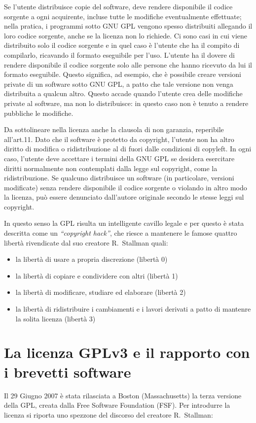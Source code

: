 Se l'utente distribuisce copie del software, deve rendere disponibile il codice sorgente a ogni acquirente, incluse tutte le modifiche eventualmente effettuate; nella pratica, i programmi sotto GNU GPL vengono spesso distribuiti allegando il loro codice sorgente, anche se la licenza non lo richiede. Ci sono casi in cui viene distribuito solo il codice sorgente e in quel caso è l'utente che ha il compito di compilarlo, ricavando il formato eseguibile per l'uso.
L'utente ha il dovere di rendere disponibile il codice sorgente solo alle persone che hanno ricevuto da lui il formato eseguibile. Questo significa, ad esempio, che è possibile creare versioni private di un software sotto GNU GPL, a patto che tale versione non venga distribuita a qualcun altro. Questo accade quando l'utente crea delle modifiche private al software, ma non lo distribuisce: in questo caso non è tenuto a rendere pubbliche le modifiche.

Da sottolineare nella licenza anche la clausola di non garanzia, reperibile all'art.11. Dato che il software è protetto da copyright, l'utente non ha altro diritto di modifica o ridistribuzione al di fuori dalle condizioni di copyleft. In ogni caso, l'utente deve accettare i termini della GNU GPL se desidera esercitare diritti normalmente non contemplati dalla legge sul copyright, come la ridistribuzione. Se qualcuno distribuisce un software (in particolare, versioni modificate) senza rendere disponibile il codice sorgente o violando in altro modo la licenza, può essere denunciato dall'autore originale secondo le stesse leggi sul copyright.

In questo senso la GPL risulta un intelligente cavillo legale e per questo è stata descritta come un \textit{``copyright hack''}, che riesce a mantenere le famose quattro libertà rivendicate dal suo creatore R.~Stallman quali:
\begin{itemize}
\item la libertà di usare a propria discrezione (libertà 0)
\item la libertà di copiare e condividere con altri (libertà 1)
\item la libertà di modificare, studiare ed elaborare (libertà 2)
\item la libertà di ridistribuire i cambiamenti e i lavori derivati a patto di mantenre la solita licenza (libertà 3)
\end{itemize}


\section{La licenza GPLv3 e il rapporto con i  brevetti software}
Il 29 Giugno 2007 è stata rilasciata a Boston (Massachusetts) la terza versione della GPL, creata dalla  Free Software Foundation (FSF).
Per introdurre la licenza si riporta uno spezzone del discorso del creatore R.~Stallman:

